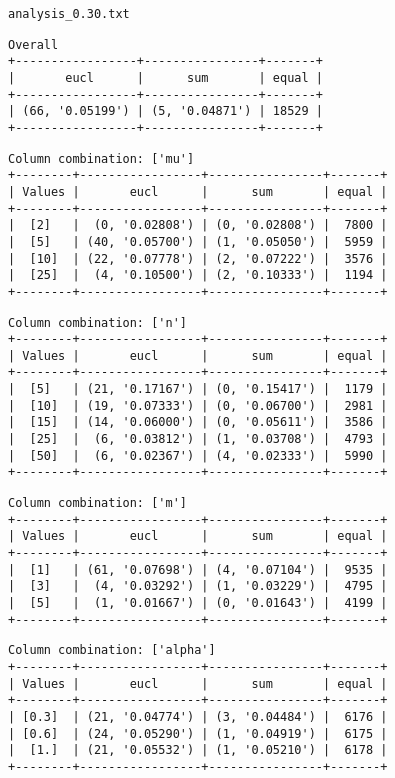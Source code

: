 \documentclass{article}
\begin{document}
\begin{verbatim}

\end{verbatim}

\newpage
\verb|analysis_0.30.txt|
\begin{verbatim}
Overall
+-----------------+----------------+-------+
|       eucl      |      sum       | equal |
+-----------------+----------------+-------+
| (66, '0.05199') | (5, '0.04871') | 18529 |
+-----------------+----------------+-------+
\end{verbatim}

\begin{verbatim}
Column combination: ['mu']
+--------+-----------------+----------------+-------+
| Values |       eucl      |      sum       | equal |
+--------+-----------------+----------------+-------+
|  [2]   |  (0, '0.02808') | (0, '0.02808') |  7800 |
|  [5]   | (40, '0.05700') | (1, '0.05050') |  5959 |
|  [10]  | (22, '0.07778') | (2, '0.07222') |  3576 |
|  [25]  |  (4, '0.10500') | (2, '0.10333') |  1194 |
+--------+-----------------+----------------+-------+
\end{verbatim}

\begin{verbatim}
Column combination: ['n']
+--------+-----------------+----------------+-------+
| Values |       eucl      |      sum       | equal |
+--------+-----------------+----------------+-------+
|  [5]   | (21, '0.17167') | (0, '0.15417') |  1179 |
|  [10]  | (19, '0.07333') | (0, '0.06700') |  2981 |
|  [15]  | (14, '0.06000') | (0, '0.05611') |  3586 |
|  [25]  |  (6, '0.03812') | (1, '0.03708') |  4793 |
|  [50]  |  (6, '0.02367') | (4, '0.02333') |  5990 |
+--------+-----------------+----------------+-------+
\end{verbatim}

\begin{verbatim}
Column combination: ['m']
+--------+-----------------+----------------+-------+
| Values |       eucl      |      sum       | equal |
+--------+-----------------+----------------+-------+
|  [1]   | (61, '0.07698') | (4, '0.07104') |  9535 |
|  [3]   |  (4, '0.03292') | (1, '0.03229') |  4795 |
|  [5]   |  (1, '0.01667') | (0, '0.01643') |  4199 |
+--------+-----------------+----------------+-------+
\end{verbatim}

\begin{verbatim}
Column combination: ['alpha']
+--------+-----------------+----------------+-------+
| Values |       eucl      |      sum       | equal |
+--------+-----------------+----------------+-------+
| [0.3]  | (21, '0.04774') | (3, '0.04484') |  6176 |
| [0.6]  | (24, '0.05290') | (1, '0.04919') |  6175 |
|  [1.]  | (21, '0.05532') | (1, '0.05210') |  6178 |
+--------+-----------------+----------------+-------+
\end{verbatim}
\end{document}
